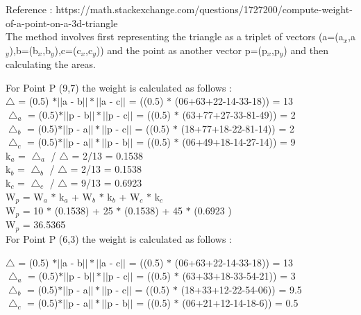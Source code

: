 \documentclass{article}[12pt]
\begin{document}
{

    Reference : https://math.stackexchange.com/questions/1727200/compute-weight-of-a-point-on-a-3d-triangle \\

    The method involves first representing the triangle as a triplet of vectors (a=(a$_{x}$,a$_{y}$),b=(b$_{x}$,b$_{y}$),c=(c$_{x}$,c$_{y}$)) and the point as another vector p=(p$_{x}$,p$_{y}$) and then calculating the areas.

    For Point P (9,7) the weight is calculated as follows : \\

    $\bigtriangleup$ = (0.5) $\ast||$a - b$||\ast||$a - c$||$ = ((0.5) $\ast$ (06+63+22-14-33-18)) = 13 \\
    $\bigtriangleup _{a}$ = (0.5)$\ast||$p - b$||\ast||$p - c$||$ = ((0.5) $\ast$ (63+77+27-33-81-49)) = 2 \\
    $\bigtriangleup _{b}$ = (0.5)$\ast||$p - a$||\ast||$p - c$||$ = ((0.5) $\ast$ (18+77+18-22-81-14)) = 2 \\
    $\bigtriangleup _{c}$ = (0.5)$\ast||$p - a$||\ast||$p - b$||$ = ((0.5) $\ast$ (06+49+18-14-27-14)) = 9 \\

    k$_{a}$ = $\bigtriangleup _{a}$ / $\bigtriangleup$ = 2/13 = 0.1538 \\
    k$_{b}$ = $\bigtriangleup _{b}$ / $\bigtriangleup$ = 2/13 = 0.1538 \\
    k$_{c}$ = $\bigtriangleup _{c}$ / $\bigtriangleup$ = 9/13 = 0.6923 \\

    W$_{p}$ = W$_{a}$ $\ast$ k$_{a}$ + W$_{b}$ $\ast$ k$_{b}$ + W$_{c}$ $\ast$ k$_{c}$ \\
    W$_{p}$ = 10 $\ast$ (0.1538) + 25 $\ast$ (0.1538) + 45 $\ast$ (0.6923 ) \\
    W$_{p}$ = 36.5365 \\

    For Point P (6,3) the weight is calculated as follows : 

    $\bigtriangleup$ = (0.5) $\ast||$a - b$||\ast||$a - c$||$ = ((0.5) $\ast$ (06+63+22-14-33-18)) = 13 \\
    $\bigtriangleup _{a}$ = (0.5)$\ast||$p - b$||\ast||$p - c$||$ = ((0.5) $\ast$ (63+33+18-33-54-21)) = 3 \\
    $\bigtriangleup _{b}$ = (0.5)$\ast||$p - a$||\ast||$p - c$||$ = ((0.5) $\ast$ (18+33+12-22-54-06)) = 9.5 \\
    $\bigtriangleup _{c}$ = (0.5)$\ast||$p - a$||\ast||$p - b$||$ = ((0.5) $\ast$ (06+21+12-14-18-6)) = 0.5 \\

}
\end{document}
